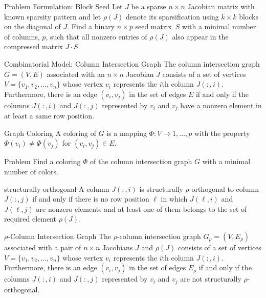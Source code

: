 \documentclass{beamer}
\newcommand{\sparsifysymbol}{\ensuremath{\rho}}
\newcommand{\sparsify}[1]{\ensuremath{\sparsifysymbol(#1)}}
\begin{document}
\begin{frame}{Problem Formulation: Block Seed}
Let $J$ be a sparse $n \times n$ Jacobian matrix with known sparsity pattern and let
\sparsify{J} denote its sparsification using $k \times k$ blocks on the diagonal of $J$.
Find a binary $n \times p$ seed matrix~$S$ with a minimal number of columns, $p$, such
that all nonzero entries of \sparsify{J} also appear in the compressed matrix $J \cdot
S$.
\end{frame}

\begin{frame}{Combinatorial Model: Column Intersection Graph}
The column intersection graph $G = (V,E)$ associated with an $n \times n$ Jacobian $J$
consists of a set of vertices $V=\{v_1, v_2, \dots, v_n\}$ whose vertex $v_i$ represents
the $i$th column $J(:,i)$. Furthermore, there is an edge $(v_i,v_j)$ in the set of edges
$E$ if and only if the columns $J(:,i)$ and $J(:,j)$ represented by $v_i$ and $v_j$ have
a nonzero element in at least a same row position.
\end{frame}

\begin{frame}{Graph Coloring}
A coloring of $G$ is a mapping $\Phi : V \to {1, \dots, p}$ with the property
$\Phi(v_i)\neq \Phi(v_j)$ for $(v_i,v_j) \in E$.

\begin{alertblock}{Problem}
Find a coloring $\Phi$ of the column intersection graph $G$ with a minimal number of
colors.
\end{alertblock}
\end{frame}

\begin{frame}{structurally orthogonal}
A column $J(:,i)$ is structurally $\sparsifysymbol$-orthogonal to column $J(:,j)$ if and
only if there is no row position $\ell$ in which $J(\ell,i)$ and $J(\ell,j)$ are nonzero
elements and at least one of them belongs to the set of required element \sparsify{J}.
\end{frame}

\begin{frame}{$\sparsifysymbol$-Column Intersection Graph}
The $\sparsifysymbol$-column intersection graph $G_\sparsifysymbol =
(V,E_\sparsifysymbol)$ associated with a pair of $n \times n$ Jacobians $J$ and
\sparsify{J} consists of a set of vertices $V=\{v_1, v_2, \dots, v_n\}$ whose vertex
$v_i$ represents the $i$th column $J(:,i)$. Furthermore, there is an edge $(v_i,v_j)$ in
the set of edges $E_\sparsifysymbol$ if and only if the columns $J(:,i)$ and $J(:,j)$
represented by $v_i$ and $v_j$ are not structurally $\sparsifysymbol$-orthogonal.
\end{frame}
\end{document}
